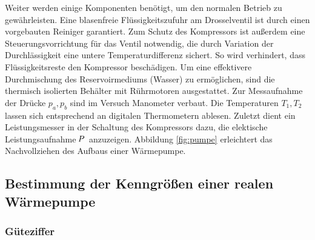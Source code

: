 Weiter werden einige Komponenten benötigt, um den normalen Betrieb zu gewährleisten. Eine
blasenfreie Flüssigkeitszufuhr am Drosselventil ist durch einen vorgebauten Reiniger garantiert.
Zum Schutz des Kompressors ist außerdem eine Steuerungsvorrichtung für das Ventil notwendig, die
durch Variation der Durchlässigkeit eine untere Temperaturdifferenz sichert. So wird verhindert,
dass Flüssigkeitsreste den Kompressor beschädigen. Um eine effektivere Durchmischung des
Reservoirmediums (Wasser) zu ermöglichen, sind die thermisch isolierten Behälter mit Rührmotoren
ausgestattet. Zur Messaufnahme der Drücke $p_a, p_b$ sind im Versuch Manometer verbaut. Die Temperaturen
$T_1, T_2$ lassen sich entsprechend an digitalen Thermometern ablesen. Zuletzt dient ein Leistungsmesser
in der Schaltung des Kompressors dazu, die elektische Leistungsaufnahme $\hspace{-0.2ex} P \hspace{0.2ex}$
anzuzeigen. Abbildung \ref{fig:pumpe} erleichtert das Nachvollziehen des Aufbaus einer Wärmepumpe.

\vfill

\subsection{Bestimmung der Kenngrößen einer realen Wärmepumpe}

\subsubsection{Güteziffer}

